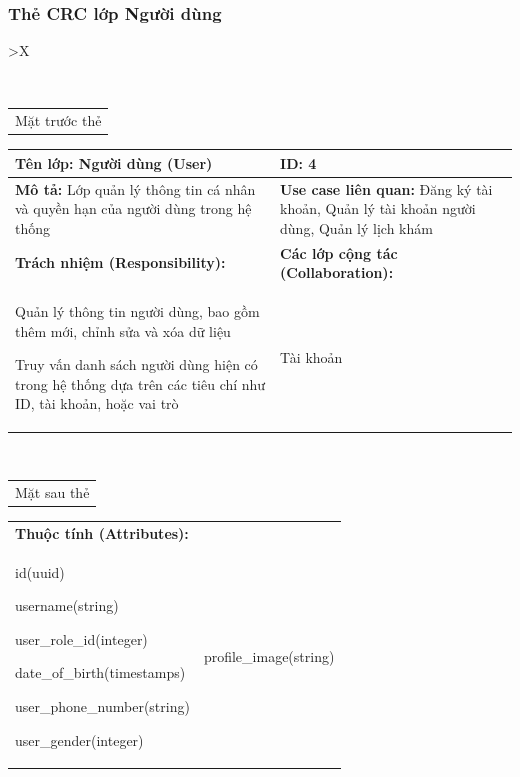 \subsubsection{Thẻ CRC lớp Người dùng}

\begin{xltabular}{\textwidth}{
		>{\centering\arraybackslash}X
	}
	\caption{\bfseries \fontsize{12pt}{0pt}\selectfont Thẻ CRC lớp Người dùng}
	\\
	\begin{tabularx}{0.9\textwidth}{X}
		Mặt trước thẻ
	\end{tabularx}
	\begin{tabularx}{0.9\textwidth}{|X|X|}
		\hline
		\textbf{Tên lớp:} Người dùng (User)                                                      & \textbf{ID:} 4                                                                                   \\
		\hline
		\textbf{Mô tả:} Lớp quản lý thông tin cá nhân và quyền hạn của người dùng trong hệ thống & \textbf{Use case liên quan:}  Đăng ký tài khoản, Quản lý tài khoản người dùng, Quản lý lịch khám \\
		\hline
		\textbf{Trách nhiệm (Responsibility):}                                                   & \textbf{Các lớp cộng tác (Collaboration):}                                                       \\
		Quản lý thông tin người dùng, bao gồm thêm mới, chỉnh sửa và xóa dữ liệu

		Truy vấn danh sách người dùng hiện có trong hệ thống dựa trên các tiêu chí như ID, tài khoản, hoặc vai trò
		                                                                                         &
		Tài khoản
		\\
		\hline
	\end{tabularx}
	\\
	\begin{tabularx}{0.9\textwidth}{X}
		Mặt sau thẻ
	\end{tabularx}
	\begin{tabularx}{0.9\textwidth}{|X|X|}
		\hline
		\textbf{Thuộc tính (Attributes):} & \\
		id(uuid)

		username(string)

		user\_role\_id(integer)

		date\_of\_birth(timestamps)

		user\_phone\_number(string)

		user\_gender(integer)
		                                  &
		profile\_image(string)


\end{tabularx}
\end{xltabular}
